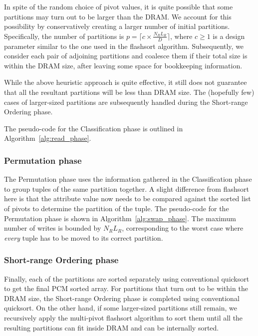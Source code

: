 In spite of the random choice of pivot values, it is quite possible that some
partitions may turn out to be larger than the DRAM. We account for this
possibility by conservatively creating a larger number of initial partitions.
Specifically, the number of partitions is $p = \lceil c \times \frac{N_R
L_R}{D} \rceil$, where $c \geq 1$ is a design parameter similar to the one used
in the flashsort algorithm. Subsequently, we consider each pair of adjoining
partitions and coalesce them if their total size is within the DRAM size, after
leaving some space for bookkeeping information. 

While the above heuristic approach is quite effective, it still does not
guarantee that all the resultant partitions will be less than DRAM size. The
(hopefully few) cases of larger-sized partitions are subsequently handled
during the Short-range Ordering phase.

The pseudo-code for the Classification phase is outlined in
Algorithm~\ref{alg:read_phase}.

%

\subsubsection{Permutation phase} The Permutation phase uses the information
gathered in the Classification phase to group tuples of the same partition
together. A slight difference from flashsort here is that the attribute value
now needs to be compared against the sorted list of pivots to determine the
partition of the tuple.  The pseudo-code for the Permutation phase is shown in
Algorithm~\ref{alg:swap_phase}.  The maximum number of writes is bounded by
$N_R L_R$, corresponding to the worst case where \emph{every} tuple has to be
moved to its correct partition.

%

\subsubsection{Short-range Ordering phase} Finally, each of the partitions are
sorted separately using conventional quicksort to get the final PCM sorted
array. For partitions that turn out to be within the DRAM size, the Short-range
Ordering phase is completed using conventional quicksort. On the other hand, if some
larger-sized partitions still remain, we recursively apply the multi-pivot
flashsort algorithm to sort them until all the resulting partitions can fit inside
DRAM and can be internally sorted.

